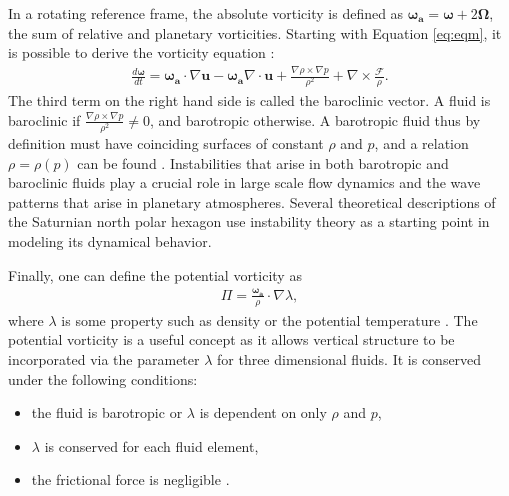 \documentclass[preprint]{revtex4-1} %
\begin{document}
In a rotating reference frame, the absolute vorticity is defined as
$\boldsymbol{\omega_a} = \boldsymbol{\omega} + 2\boldsymbol{\Omega}$,
the sum of relative and planetary vorticities.  Starting with Equation
\ref{eq:eqm}, it is possible to derive the vorticity equation \cite{Pedlosky87}:
\begin{align}
  \label{eq:vorticityeq}
  \frac{d\boldsymbol{\omega}}{dt} = \boldsymbol{\omega_a} \cdot \nabla
  \textbf{u}- \boldsymbol{\omega_a} \nabla \cdot \textbf{u} +
  \frac{\nabla \rho \times \nabla p}{\rho^2} + \nabla \times \frac{\mathcal{F}}{\rho}.
\end{align}
The third term on the right hand side is called the baroclinic
vector.  A fluid is baroclinic if $\frac{\nabla \rho \times \nabla
  p}{\rho^2} \neq 0$, and barotropic otherwise.  A barotropic fluid
thus by definition must have coinciding surfaces of constant $\rho$
and $p$, and a relation $\rho = \rho(p)$ can be found
\cite{Pedlosky87}.  Instabilities that arise in both barotropic and
baroclinic fluids play a crucial role in large scale flow dynamics and
the wave patterns that arise in planetary atmospheres.  Several
theoretical descriptions of the Saturnian north polar hexagon use
instability theory as a starting point in modeling its dynamical
behavior.

Finally, one can define the potential vorticity as
\begin{align}
  \label{eq:potentialVorticity}
  \Pi = \frac{\boldsymbol{\omega_a}}{\rho}\cdot \nabla \lambda,
\end{align}
where $\lambda$ is some property such as density or the potential
temperature \cite{Pedlosky87}.  The potential vorticity is a useful
concept as it allows vertical structure to be incorporated via the
parameter $\lambda$ for three dimensional fluids.  It is 
conserved under the following conditions: 
\begin{itemize}
  \item the fluid is barotropic or $\lambda$ is dependent on only
    $\rho$ and $p$,
  \item $\lambda$ is conserved for each fluid element,
  \item the frictional force is negligible \cite{Pedlosky87}.
\end{itemize}


\end{document}
